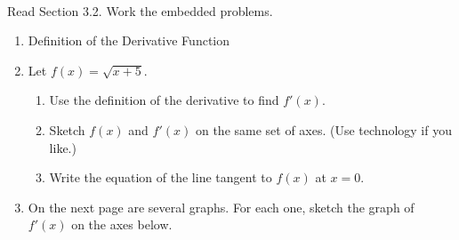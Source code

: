 \documentclass[11pt,fleqn]{article}
\begin{document}
\renewcommand{\headrulewidth}{0pt}
\newcommand{\blank}[1]{\rule{#1}{0.75pt}}
\newcommand{\bc}{\begin{center}}
\newcommand{\ec}{\end{center}}
\renewcommand{\d}{\displaystyle}

\vspace*{-0.7in}

\begin{center}
  \large
  \\
\end{center}
Read Section 3.2. Work the embedded problems. \\
\hrulefill

\begin{enumerate}
\item Definition of the Derivative Function
\vspace{0.7in}

\item Let $f(x)=\sqrt{x+5}.$
\begin{enumerate}
	\item Use the definition of the derivative to find $f'(x).$
	\vspace{3in}
	\item Sketch $f(x)$ and $f'(x)$ on the same set of axes. (Use technology if you like.)
	\vspace{2in}
	\item Write the equation of the line tangent to $f(x)$ at $x=0.$
	\vfill
	\end{enumerate}

\item On the next page are several graphs. For each one, sketch the graph of $f'(x)$ on the axes below.
\newpage
\vspace*{-.5in}
\begin{tabular}[c]{c  c }


\end{tabular}
\end{enumerate}
\end{document}
